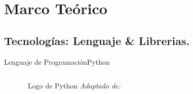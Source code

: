 \section{Marco Teórico}
\subsection[Tecnologías]{Tecnologías: Lenguaje \& Librerias.}

\begin{frame}{Lenguaje de Programación}{Python}
    \begin{columns}
        \begin{column}{0.4\textwidth}
            \centering
            \begin{figure}[H]
                \centering
                \vspace{-0.25cm}
                \caption{\tiny~Logo de Python \textit{Adaptado de:}~\cite{PythonSoftwareFoundation}}%
                \label{fig:Python_logo}
            \end{figure}
        \end{column}
        \begin{column}{0.6\textwidth}

\end{column}
\end{columns}
\end{frame}
